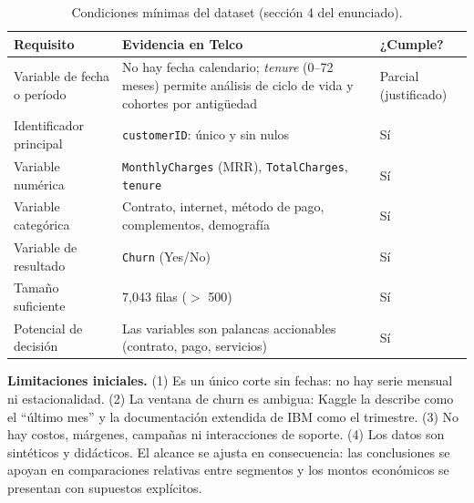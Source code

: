 \documentclass[10.5pt,a4paper]{article}
\begin{document}
\begin{table}[H]
\centering\footnotesize
\caption{Condiciones mínimas del dataset (sección 4 del enunciado).}
\begin{tabularx}{\textwidth}{@{}lXl@{}}
\toprule
Requisito & Evidencia en Telco & ¿Cumple? \\
\midrule
Variable de fecha o período & No hay fecha calendario; \emph{tenure} (0–72 meses) permite análisis de ciclo de vida y cohortes por antigüedad & Parcial (justificado) \\
Identificador principal & \texttt{customerID}: único y sin nulos & Sí \\
Variable numérica & \texttt{MonthlyCharges} (MRR), \texttt{TotalCharges}, \texttt{tenure} & Sí \\
Variable categórica & Contrato, internet, método de pago, complementos, demografía & Sí \\
Variable de resultado & \texttt{Churn} (Yes/No) & Sí \\
Tamaño suficiente & 7,043 filas ($>$ 500) & Sí \\
Potencial de decisión & Las variables son palancas accionables (contrato, pago, servicios) & Sí \\
\bottomrule
\end{tabularx}
\end{table}

\textbf{Limitaciones iniciales.} (1) Es un único corte sin fechas: no hay serie mensual ni estacionalidad. (2) La ventana de churn es ambigua: Kaggle la describe como el ``último mes'' y la documentación extendida de IBM como el trimestre. (3) No hay costos, márgenes, campañas ni interacciones de soporte. (4) Los datos son sintéticos y didácticos. El alcance se ajusta en consecuencia: las conclusiones se apoyan en comparaciones relativas entre segmentos y los montos económicos se presentan con supuestos explícitos.

\end{document}
